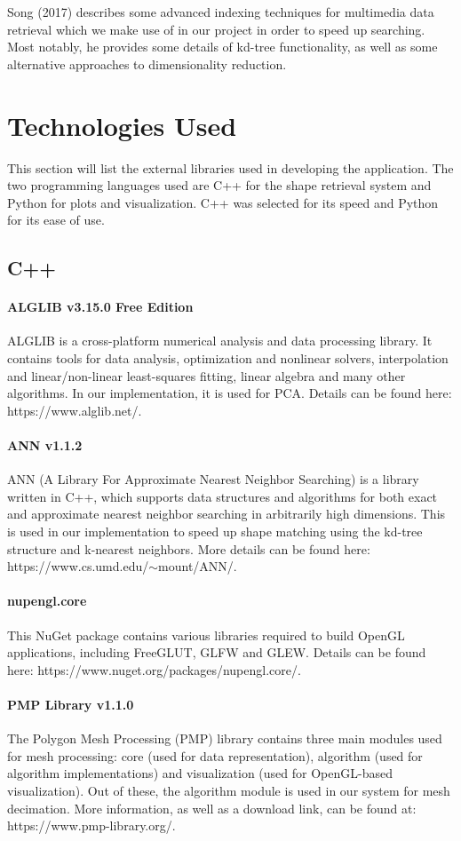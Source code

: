 \documentclass{bigdata}
\begin{document}
\noindent Song (2017) describes some advanced indexing techniques for multimedia data retrieval which we make use of in our project in order to speed up searching. Most notably, he provides some details of kd-tree functionality, as well as some alternative approaches to dimensionality reduction.

\section{Technologies Used}
This section will list the external libraries used in developing the application. The two programming languages used are C++ for the shape retrieval system and Python for plots and visualization. C++ was selected for its speed and Python for its ease of use.
\subsection{C++}
\paragraph{ALGLIB v3.15.0 Free Edition}
ALGLIB is a cross-platform numerical analysis and data processing library. It contains tools for data analysis, optimization and nonlinear solvers, interpolation and linear/non-linear least-squares fitting, linear algebra and many other algorithms. In our implementation, it is used for PCA. Details can be found here: https://www.alglib.net/.
\paragraph{ANN v1.1.2}
ANN (A Library For Approximate Nearest Neighbor Searching) is a library written in C++, which supports data structures and algorithms for both exact and approximate nearest neighbor searching in arbitrarily high dimensions. This is used in our implementation to speed up shape matching using the kd-tree structure and k-nearest neighbors. More details can be found here: https://www.cs.umd.edu/$\sim$mount/ANN/.
\paragraph{nupengl.core}
This NuGet package contains various libraries required to build OpenGL applications, including FreeGLUT, GLFW and GLEW. Details can be found here: https://www.nuget.org/packages/nupengl.core/.
\paragraph{PMP Library v1.1.0}
The Polygon Mesh Processing (PMP) library contains three main modules used for mesh processing: core (used for data representation), algorithm (used for algorithm implementations) and visualization (used for OpenGL-based visualization). Out of these, the algorithm module is used in our system for mesh decimation. More information, as well as a download link, can be found at: https://www.pmp-library.org/.
\end{document}
